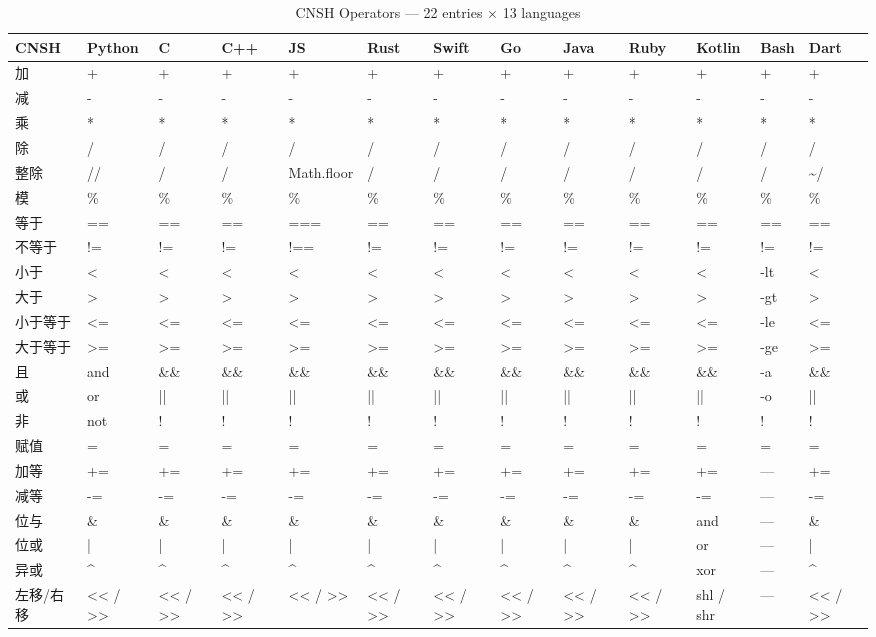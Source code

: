 \begin{table}[h]
\centering
\caption{CNSH Operators — 22 entries × 13 languages}
\renewcommand{\arraystretch}{1.2}
\fontsize{8}{10}\selectfont
\begin{tabular}{lllllllllllll}
\toprule
\textbf{CNSH} & \textbf{Python} & \textbf{C} & \textbf{C++} & \textbf{JS} & \textbf{Rust} & \textbf{Swift} & \textbf{Go} & \textbf{Java} & \textbf{Ruby} & \textbf{Kotlin} & \textbf{Bash} & \textbf{Dart} \\
\midrule
加 & + & + & + & + & + & + & + & + & + & + & + & + \\
减 & - & - & - & - & - & - & - & - & - & - & - & - \\
乘 & * & * & * & * & * & * & * & * & * & * & * & * \\
除 & / & / & / & / & / & / & / & / & / & / & / & / \\
整除 & // & / & / & Math.floor & / & / & / & / & / & / & / & \textasciitilde/ \\
模 & \% & \% & \% & \% & \% & \% & \% & \% & \% & \% & \% & \% \\
等于 & == & == & == & === & == & == & == & == & == & == & == & == \\
不等于 & != & != & != & !== & != & != & != & != & != & != & != & != \\
小于 & < & < & < & < & < & < & < & < & < & < & -lt & < \\
大于 & > & > & > & > & > & > & > & > & > & > & -gt & > \\
小于等于 & <= & <= & <= & <= & <= & <= & <= & <= & <= & <= & -le & <= \\
大于等于 & >= & >= & >= & >= & >= & >= & >= & >= & >= & >= & -ge & >= \\
且 & and & \&\& & \&\& & \&\& & \&\& & \&\& & \&\& & \&\& & \&\& & \&\& & -a & \&\& \\
或 & or & || & || & || & || & || & || & || & || & || & -o & || \\
非 & not & ! & ! & ! & ! & ! & ! & ! & ! & ! & ! & ! \\
赋值 & = & = & = & = & = & = & = & = & = & = & = & = \\
加等 & += & += & += & += & += & += & += & += & += & += & — & += \\
减等 & -= & -= & -= & -= & -= & -= & -= & -= & -= & -= & — & -= \\
位与 & \& & \& & \& & \& & \& & \& & \& & \& & \& & and & — & \& \\
位或 & | & | & | & | & | & | & | & | & | & or & — & | \\
异或 & \textasciicircum & \textasciicircum & \textasciicircum & \textasciicircum & \textasciicircum & \textasciicircum & \textasciicircum & \textasciicircum & \textasciicircum & xor & — & \textasciicircum \\
左移/右移 & << / >> & << / >> & << / >> & << / >> & << / >> & << / >> & << / >> & << / >> & << / >> & shl / shr & — & << / >> \\
\bottomrule
\end{tabular}
\end{table}

